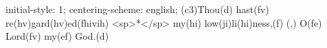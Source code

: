 initial-style: 1;
centering-scheme: english;
(c3)Thou(d) hast(fv) re(hv)gard(hv)ed(fhivih) <sp>*</sp> my(hi) low(ji)li(hi)ness,(f) (,) O(fe) Lord(fv) my(ef) God.(d)